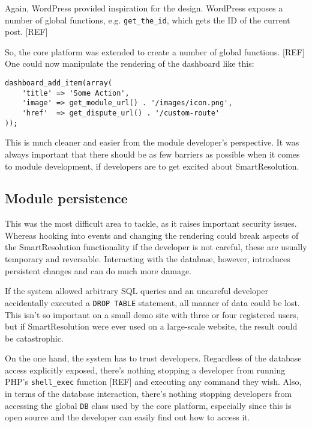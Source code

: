 Again, WordPress provided inspiration for the design. WordPress exposes a number of global functions, e.g. \lstinline{get_the_id}, which gets the ID of the current post. [REF] %

So, the core platform was extended to create a number of global functions. [REF] One could now manipulate the rendering of the dashboard like this: %

\begin{lstlisting}
dashboard_add_item(array(
    'title' => 'Some Action',
    'image' => get_module_url() . '/images/icon.png',
    'href'  => get_dispute_url() . '/custom-route'
));
\end{lstlisting}

This is much cleaner and easier from the module developer's perspective. It was always important that there should be as few barriers as possible when it comes to module development, if developers are to get excited about SmartResolution.

\subsection{Module persistence}

This was the most difficult area to tackle, as it raises important security issues. Whereas hooking into events and changing the rendering could break aspects of the SmartResolution functionality if the developer is not careful, these are usually temporary and reversable. Interacting with the database, however, introduces persistent changes and can do much more damage.

If the system allowed arbitrary SQL queries and an uncareful developer accidentally executed a \lstinline{DROP TABLE} statement, all manner of data could be lost. This isn't so important on a small demo site with three or four registered users, but if SmartResolution were ever used on a large-scale website, the result could be catastrophic.

On the one hand, the system has to trust developers. Regardless of the database access explicitly exposed, there's nothing stopping a developer from running PHP's \lstinline{shell_exec} function [REF] and executing any command they wish. Also, in terms of the database interaction, there's nothing stopping developers from accessing the global \lstinline{DB} class used by the core platform, especially since this is open source and the developer can easily find out how to access it.

